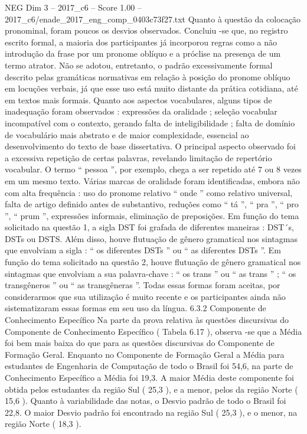 \begin{textsample}{NEG Dim 3 – 2017\_c6 – Score 1.00 – 2017\_c6/enade\_2017\_eng\_comp\_0403c73f27.txt}
Quanto à questão da colocação pronominal, foram poucos os desvios observados.
Concluiu -se que, no registro escrito formal, a maioria dos participantes já incorporou regras como a não introdução da frase por um pronome oblíquo e a próclise na presença de um termo atrator.
Não se adotou, entretanto, o padrão excessivamente formal descrito pelas gramáticas normativas em relação à posição do pronome oblíquo em locuções verbais, já que esse uso está muito distante da prática cotidiana, até em textos mais formais.
Quanto aos aspectos vocabulares, alguns tipos de inadequação foram observados : expressões da oralidade ; seleção vocabular incompatível com o contexto, gerando falta de inteligibilidade ; falta de domínio de vocabulário mais abstrato e de maior complexidade, essencial ao desenvolvimento do texto de base dissertativa.
O principal aspecto observado foi a excessiva repetição de certas palavras, revelando limitação de repertório vocabular.
O termo “ pessoa ”, por exemplo, chega a ser repetido até 7 ou 8 vezes em um mesmo texto.
Várias marcas de oralidade foram identificadas, embora não com alta frequência : uso do pronome relativo “ onde ” como relativo universal, falta de artigo definido antes de substantivo, reduções como “ tá ”, “ pra ”, “ pro ”, “ prum ”, expressões informais, eliminação de preposições.
Em função do tema solicitado na questão 1, a sigla DST foi grafada de diferentes maneiras : DST´s, DSTs ou DSTS.
Além disso, houve flutuação de gênero gramatical nos sintagmas que envolviam a sigla : “ os diferentes DSTs ” ou “ as diferentes DSTs ”.
Em função do tema solicitado na questão 2, houve flutuação de gênero gramatical nos sintagmas que envolviam a sua palavra-chave : “ os trans ” ou “ as trans ” ; “ os transgêneros ” ou “ as transgêneras ”.
Todas essas formas foram aceitas, por considerarmos que sua utilização é muito recente e os participantes ainda não sistematizaram essas formas em seu uso da língua. 6.3.2 Componente de Conhecimento Específico Na parte da prova relativa às questões discursivas do Componente de Conhecimento Específico ( Tabela 6.17 ), observa -se que a Média foi bem mais baixa do que para as questões discursivas do Componente de Formação Geral.
Enquanto no Componente de Formação Geral a Média para estudantes de Engenharia de Computação de todo o Brasil foi 54,6, na parte de Conhecimento Específico a Média foi 19,3.
A maior Média deste componente foi obtida pelos estudantes da região Sul ( 25,3 ), e a menor, pelos da região Norte ( 15,6 ).
Quanto à variabilidade das notas, o Desvio padrão de todo o Brasil foi 22,8.
O maior Desvio padrão foi encontrado na região Sul ( 25,3 ), e o menor, na região Norte ( 18,3 ).

\end{textsample}
